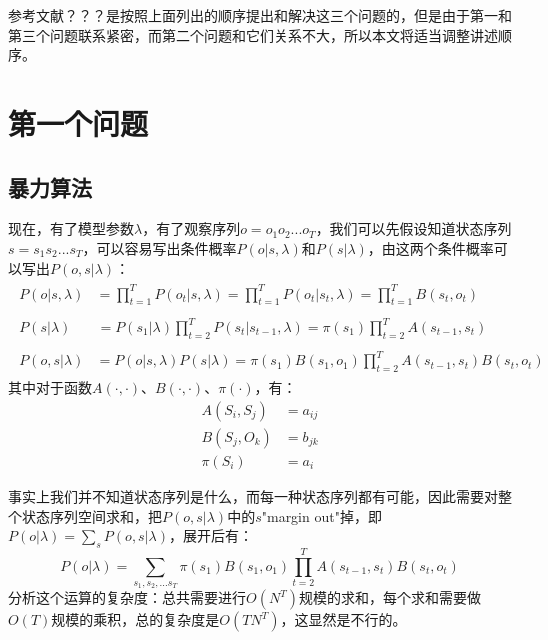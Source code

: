\documentclass[11pt,a4paper]{article}
\numberwithin{equation}{section}
\begin{document}
参考文献？？？是按照上面列出的顺序提出和解决这三个问题的，但是由于第一和第三个问题联系紧密，而第二个问题和它们关系不大，所以本文将适当调整讲述顺序。

\section{第一个问题}

\subsection{暴力算法}

现在，有了模型参数$ \lambda $，有了观察序列$ o = o_1 o_2 ... o_T $，我们可以先假设知道状态序列$ s = s_1 s_2 ... s_T $，可以容易写出条件概率$ P(o | s, \lambda) $和$ P(s | \lambda) $，由这两个条件概率可以写出$ P(o, s | \lambda) $：
\begin{align}
\begin{split}
P(o | s, \lambda) 
& = \prod_{t = 1}^T P(o_t | s, \lambda) = \prod_{t = 1}^T P(o_t | s_t, \lambda) = \prod_{t = 1}^T B(s_t, o_t)
\end{split}
\\
\begin{split}
P(s | \lambda) \quad
& = P(s_1 | \lambda) \prod_{t = 2}^T P(s_t | s_{t - 1}, \lambda) = \pi(s_1) \prod_{t = 2}^T A(s_{t - 1}, s_t)
\end{split}
\\
\begin{split}
P(o, s | \lambda)
& = P(o | s, \lambda) P(s | \lambda) = \pi(s_1) B(s_1, o_1) \prod_{t = 2}^T A(s_{t - 1}, s_t) B(s_t, o_t)
\end{split}
\end{align}
其中对于函数$ A(\cdot, \cdot) $、$ B(\cdot, \cdot) $、$ \pi(\cdot) $，有：
\begin{subequations}
\begin{align}
A(S_i, S_j) & = a_{ij}\\
B(S_j, O_k) & = b_{jk}\\
\pi(S_i) & = a_{i}
\end{align}
\end{subequations}

事实上我们并不知道状态序列是什么，而每一种状态序列都有可能，因此需要对整个状态序列空间求和，把$ P(o, s | \lambda) $中的$ s $"margin out"掉，即$ P(o | \lambda) = \sum_s P(o, s| \lambda) $，展开后有：
\begin{equation}\label{P(o|lambda)}
P(o | \lambda) = \sum_{s_1, s_2, ... s_T} \pi(s_1) B(s_1, o_1) \prod_{t = 2}^T A(s_{t - 1}, s_t) B(s_t, o_t)
\end{equation}
分析这个运算的复杂度：总共需要进行$O(N^T)$规模的求和，每个求和需要做$ O(T) $规模的乘积，总的复杂度是$ O(TN^T) $，这显然是不行的。
\end{document}
